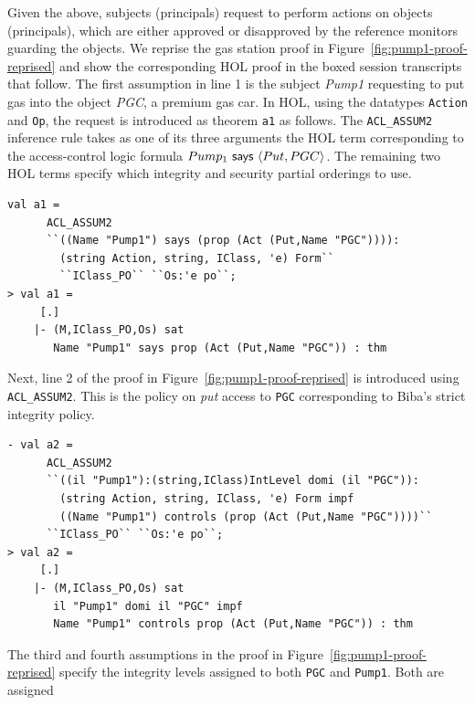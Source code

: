 Given the above, subjects (principals) request to perform actions on
objects (principals), which are either approved or disapproved by the
reference monitors guarding the objects. We reprise the gas station
proof in Figure~\ref{fig:pump1-proof-reprised} and show the
corresponding HOL proof in the boxed session transcripts that
follow. The first assumption in line 1 is the subject \emph{Pump1}
requesting to put gas into the object \emph{PGC}, a premium gas
car. In HOL, using the datatypes \texttt{Action} and \texttt{Op}, the
request is introduced as theorem \texttt{a1} as follows. The
\texttt{ACL\_ASSUM2} inference rule takes as one of its three
arguments the HOL term corresponding to the access-control logic
formula $Pump_1 \textsf{ says } \langle Put,PGC \rangle$. The remaining two HOL terms
specify which integrity and security partial orderings to use.
\begin{session}
\begin{footnotesize}
\begin{verbatim}
val a1 = 
      ACL_ASSUM2  
      ``((Name "Pump1") says (prop (Act (Put,Name "PGC")))):
     	(string Action, string, IClass, 'e) Form`` 
    	``IClass_PO`` ``Os:'e po``;
> val a1 =
     [.]
    |- (M,IClass_PO,Os) sat 
       Name "Pump1" says prop (Act (Put,Name "PGC")) : thm
\end{verbatim}
\end{footnotesize}
\end{session}
Next, line 2 of the proof in Figure~\ref{fig:pump1-proof-reprised} is
introduced using \texttt{ACL\_ASSUM2}. This is the policy on
\emph{put} access to \texttt{PGC} corresponding to Biba's strict
integrity policy.
\begin{session}
  \begin{footnotesize}
\begin{verbatim}
- val a2 =
      ACL_ASSUM2 
      ``((il "Pump1"):(string,IClass)IntLevel domi (il "PGC")):
        (string Action, string, IClass, 'e) Form impf
        ((Name "Pump1") controls (prop (Act (Put,Name "PGC"))))``
      ``IClass_PO`` ``Os:'e po``;
> val a2 =
     [.]
    |- (M,IClass_PO,Os) sat
       il "Pump1" domi il "PGC" impf
       Name "Pump1" controls prop (Act (Put,Name "PGC")) : thm
\end{verbatim}
  \end{footnotesize}
\end{session}
The third and fourth assumptions in the proof in
Figure~\ref{fig:pump1-proof-reprised} specify the integrity levels
assigned to both \texttt{PGC} and \texttt{Pump1}.  Both are assigned
